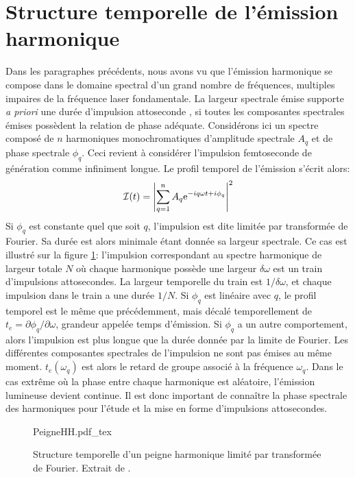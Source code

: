 \section{Structure temporelle de l'émission harmonique}
Dans les paragraphes précédents, nous avons vu que l'émission harmonique se compose dans le domaine spectral d'un grand nombre de fréquences, multiples impaires de la fréquence laser fondamentale. La largeur spectrale émise supporte \textit{a priori} une durée d'impulsion attoseconde , si toutes les composantes spectrales émises possèdent la relation de phase adéquate. Considérons ici un spectre composé de $n$ harmoniques monochromatiques d'amplitude spectrale $A_q$ et de phase spectrale $\phi_q$. Ceci revient à considérer l'impulsion femtoseconde de génération comme infiniment longue. Le profil temporel de l'émission s'écrit alors:
\begin{equation}
\mathcal{I}(t) = \left| \sum_{q=1}^n A_q \mathrm{e}^{-iq\omega t + i \phi_q} \right|^2
\end{equation}
Si $\phi_q$ est constante quel que soit $q$, l'impulsion est dite limitée par transformée de Fourier. Sa durée est alors minimale étant donnée sa largeur spectrale. Ce cas est illustré sur la figure \ref{fig:PeigneHH}: l'impulsion correspondant au spectre harmonique de largeur totale $N$ où chaque harmonique possède une largeur $\delta \omega$ est un train d'impulsions attosecondes. La largeur temporelle du train est $1/\delta \omega$, et chaque impulsion dans le train a une durée $1/N$. Si $\phi_q$ est linéaire avec $q$, le profil temporel est le même que précédemment, mais décalé temporellement de $t_e = \partial \phi_q / \partial \omega$, grandeur appelée temps d'émission. Si $\phi_q$ a un autre comportement, alors l'impulsion est plus longue que la durée donnée par la limite de Fourier. Les différentes composantes spectrales de l'impulsion ne sont pas émises au même moment. $t_e (\omega_q)$ est alors le retard de groupe associé à la fréquence $\omega_q$. Dans le cas extrême où la phase entre chaque harmonique est aléatoire, l'émission lumineuse devient continue. Il est donc important de connaître la phase spectrale des harmoniques pour l'étude et la mise en forme d'impulsions attosecondes.

\begin{figure}
\centering
\def\svgwidth{\columnwidth}
{PeigneHH.pdf_tex}
\caption{Structure temporelle d'un peigne harmonique limité par transformée de Fourier. Extrait de .}
\label{fig:PeigneHH}
\end{figure}

